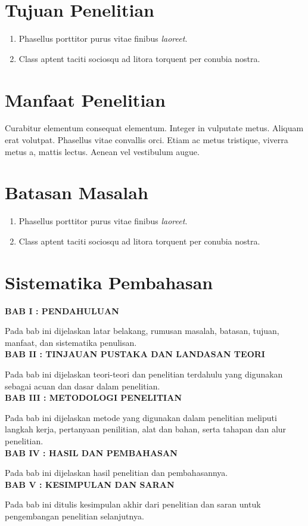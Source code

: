 \section{Tujuan Penelitian}

\begin{enumerate}
\item  Phasellus porttitor purus vitae finibus \emph{laoreet}.
\item Class aptent taciti sociosqu ad litora torquent per conubia nostra.
\end{enumerate}


\section{Manfaat Penelitian}

Curabitur elementum consequat elementum. Integer in vulputate
metus. Aliquam erat volutpat. Phasellus vitae convallis orci. Etiam ac
metus tristique, viverra metus a, mattis lectus. Aenean vel vestibulum
augue.


\section{Batasan Masalah}

\begin{enumerate}
\item  Phasellus porttitor purus vitae finibus \emph{laoreet}.
\item Class aptent taciti sociosqu ad litora torquent per conubia nostra.
\end{enumerate}


\section{Sistematika Pembahasan}
\noindent
\textbf{BAB I : PENDAHULUAN}

Pada bab ini dijelaskan latar belakang, rumusan masalah, batasan,
tujuan, manfaat,  dan sistematika penulisan.\\

\noindent
\textbf{BAB II : TINJAUAN PUSTAKA DAN LANDASAN TEORI}

Pada bab ini dijelaskan teori-teori dan penelitian terdahulu yang
digunakan sebagai acuan dan dasar dalam penelitian.\\

\noindent
\textbf{BAB III : METODOLOGI PENELITIAN}

Pada bab ini dijelaskan metode yang digunakan dalam penelitian
meliputi langkah kerja, pertanyaan penilitian, alat dan bahan, serta
tahapan dan alur penelitian.\\

\noindent
\textbf{BAB IV : HASIL DAN PEMBAHASAN}

Pada bab ini dijelaskan hasil penelitian dan pembahasannya.\\

\noindent
\textbf{BAB V : KESIMPULAN DAN SARAN}

Pada bab ini ditulis kesimpulan akhir dari penelitian dan saran untuk
pengembangan penelitian selanjutnya.\\
